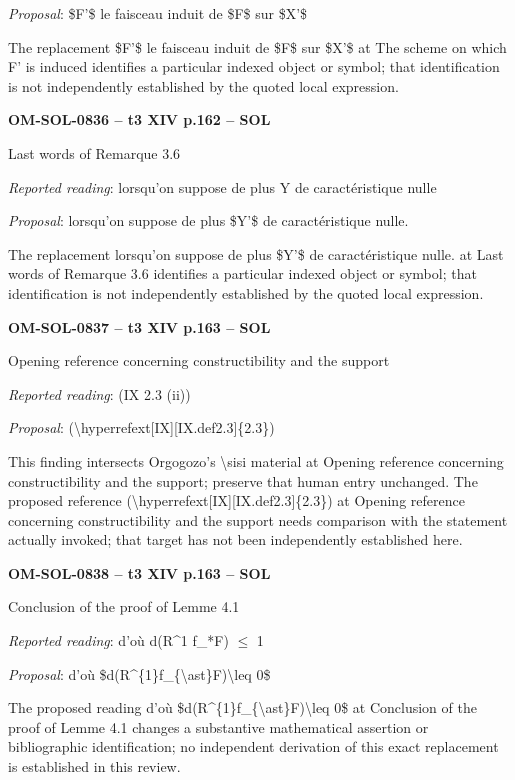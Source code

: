 \emph{Proposal}: \$F'\$ le faisceau induit de \$F\$ sur \$X'\$\par
The replacement \$F'\$ le faisceau induit de \$F\$ sur \$X'\$ at The scheme on which F' is induced identifies a particular indexed object or symbol; that identification is not independently established by the quoted local expression.\par
\par\noindent\textbf{OM-SOL-0836 -- t3 XIV p.162 -- SOL}\par
Last words of Remarque 3.6\par
\emph{Reported reading}: lorsqu'on suppose de plus Y de caractéristique nulle\par
\emph{Proposal}: lorsqu'on suppose de plus \$Y'\$ de caractéristique nulle.\par
The replacement lorsqu'on suppose de plus \$Y'\$ de caractéristique nulle. at Last words of Remarque 3.6 identifies a particular indexed object or symbol; that identification is not independently established by the quoted local expression.\par
\par\noindent\textbf{OM-SOL-0837 -- t3 XIV p.163 -- SOL}\par
Opening reference concerning constructibility and the support\par
\emph{Reported reading}: (IX 2.3 (ii))\par
\emph{Proposal}: (\textbackslash{}hyperrefext[IX][IX.def2.3]\{2.3\})\par
This finding intersects Orgogozo's \textbackslash{}sisi material at Opening reference concerning constructibility and the support; preserve that human entry unchanged. The proposed reference (\textbackslash{}hyperrefext[IX][IX.def2.3]\{2.3\}) at Opening reference concerning constructibility and the support needs comparison with the statement actually invoked; that target has not been independently established here.\par
\par\noindent\textbf{OM-SOL-0838 -- t3 XIV p.163 -- SOL}\par
Conclusion of the proof of Lemme 4.1\par
\emph{Reported reading}: d'où d(R\textasciicircum{}1 f\_*F) \ensuremath{\leq} 1\par
\emph{Proposal}: d'où \$d(R\textasciicircum{}\{1\}f\_\{\textbackslash{}ast\}F)\textbackslash{}leq 0\$\par
The proposed reading d'où \$d(R\textasciicircum{}\{1\}f\_\{\textbackslash{}ast\}F)\textbackslash{}leq 0\$ at Conclusion of the proof of Lemme 4.1 changes a substantive mathematical assertion or bibliographic identification; no independent derivation of this exact replacement is established in this review.\par
